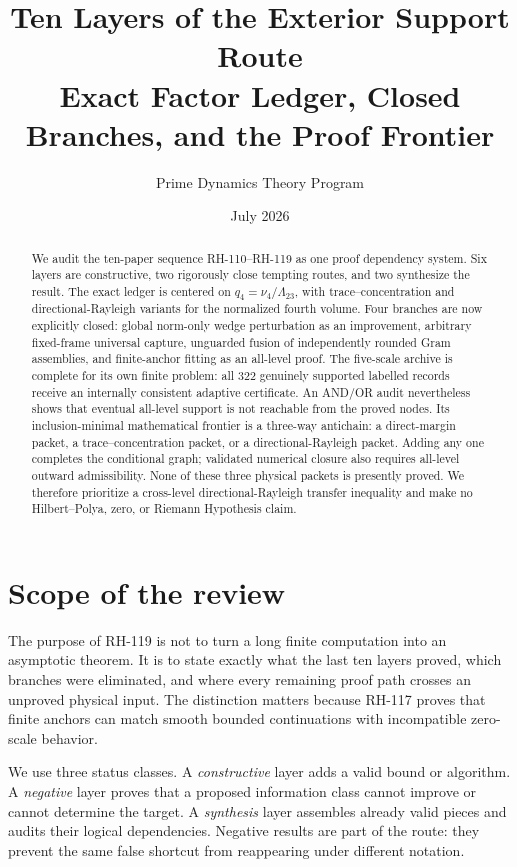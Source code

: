 \documentclass[12pt]{article}
\title{Ten Layers of the Exterior Support Route\\\large Exact Factor Ledger, Closed Branches, and the Proof Frontier}
\author{Prime Dynamics Theory Program}
\date{July 2026}
\begin{document}
\maketitle

\begin{abstract}
We audit the ten-paper sequence RH-110--RH-119 as one proof dependency
system.  Six layers are constructive, two rigorously close tempting routes,
and two synthesize the result.  The exact ledger is centered on
$q_4=\nu_4/\Lambda_{23}$, with trace--concentration and directional-Rayleigh
variants for the normalized fourth volume.  Four branches are now explicitly
closed: global norm-only wedge perturbation as an improvement, arbitrary
fixed-frame universal capture, unguarded fusion of independently rounded
Gram assemblies, and finite-anchor fitting as an all-level proof.  The
five-scale archive is complete for its own finite problem: all 322 genuinely
supported labelled records receive an internally consistent adaptive
certificate.  An AND/OR audit nevertheless shows that eventual all-level
support is not reachable from the proved nodes.  Its inclusion-minimal
mathematical frontier is a three-way antichain: a direct-margin packet, a
trace--concentration packet, or a directional-Rayleigh packet.  Adding any
one completes the conditional graph; validated numerical closure also
requires all-level outward admissibility.  None of these three physical
packets is presently proved.  We therefore prioritize a cross-level
directional-Rayleigh transfer inequality and make no Hilbert--Polya, zero,
or Riemann Hypothesis claim.
\end{abstract}

\section{Scope of the review}
The purpose of RH-119 is not to turn a long finite computation into an
asymptotic theorem.  It is to state exactly what the last ten layers proved,
which branches were eliminated, and where every remaining proof path crosses
an unproved physical input.  The distinction matters because RH-117 proves
that finite anchors can match smooth bounded continuations with incompatible
zero-scale behavior.

We use three status classes.  A \emph{constructive} layer adds a valid bound
or algorithm.  A \emph{negative} layer proves that a proposed information
class cannot improve or cannot determine the target.  A \emph{synthesis}
layer assembles already valid pieces and audits their logical dependencies.
Negative results are part of the route: they prevent the same false shortcut
from reappearing under different notation.
\end{document}
